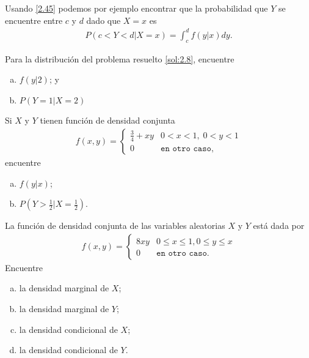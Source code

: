  Usando \eqref{2.45} podemos por ejemplo encontrar que la probabilidad que $Y$  se encuentre entre $c$ y $d$ dado que $X=x$ es
 \begin{align}
  \label{2.46}P(c<Y<d|X=x)=
  \int_{c}^{d}f(y|x)dy.
 \end{align}




 \begin{ejemplo}
  \label{sol:2.27}
  Para la distribución del problema resuelto \ref{sol:2.8}, encuentre
  \begin{enumerate}[(a)]
   \item $f(y|2)$; y  
   \item $P(Y=1|X=2)$
  \end{enumerate}

 \end{ejemplo}



\begin{ejemplo}
 \label{sol:2.28}
  Si $X$ y $Y$ tienen función de densidad conjunta
 \begin{align}
  f(x,y)=
  \begin{cases}
   \frac{3}{4}+xy & 0<x<1, \; 0<y<1 \\
   0 & \texttt{en otro caso},
  \end{cases}
 \end{align}
encuentre
\begin{enumerate}[(a)]
 \item $f(y|x)$; 
 \item $P(Y>\frac{1}{2}| X = \frac{1}{2} )$.
\end{enumerate}

\end{ejemplo}



 \begin{ejemplo}
  \label{sol:2.29}
  La función de densidad conjunta de las variables aleatorias $X$ y $Y$ está dada por
  \begin{align}
   f(x,y)=
   \begin{cases}
    8xy & 0\leq x \leq 1, 0\leq y \leq x \\
    0 & \texttt{en otro caso}.
   \end{cases}
  \end{align}
Encuentre
\begin{enumerate}[(a)]
 \item la densidad marginal de $X$; 
 \item la densidad marginal de $Y$; 
 \item la densidad condicional de $X$; 
 \item la densidad condicional de $Y$.
\end{enumerate}

 \end{ejemplo}



